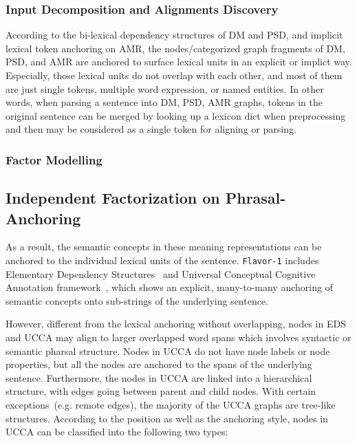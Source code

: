 \subsubsection{Input Decomposition and Alignments Discovery}
\label{sssec:lex-phr:lex-input-decomposition}
According to the bi-lexical dependency structures of DM and PSD, and
implicit lexical token anchoring on AMR, the nodes/categorized graph
fragments of DM, PSD, and AMR are anchored to surface lexical units in
an explicit or implict way. Especially, those lexical units do not
overlap with each other, and most of them are just single tokens,
multiple word expression, or named entities. In other words, when
parsing a sentence into DM, PSD, AMR graphs, tokens in the original
sentence can be merged by looking up a lexicon dict when preprocessing
and then may be considered as a single token for aligning or parsing.

\subsubsection{Factor Modelling}
\label{sssec:lex-phr:factor-modelling}




\subsection{Independent Factorization on Phrasal-Anchoring}
\label{ssec:lex-phr:phr-factorization-analysis}

As a result, the semantic concepts in these meaning
representations can be anchored to the individual lexical units of the
sentence. \texttt{Flavor-1} includes Elementary Dependency
Structures~\cite[EDS,][]{oepen2006discriminant} and Universal
Conceptual Cognitive Annotation
framework~\cite[UCCA,][]{abend2013universal}, which shows an explicit,
many-to-many anchoring of semantic concepts onto sub-strings of the
underlying sentence.

However, different from the lexical anchoring without overlapping,
nodes in EDS and UCCA may align to larger overlapped word spans which
involves syntactic or semantic pharsal structure. Nodes in UCCA do not
have node labels or node properties, but all the nodes are anchored to
the spans of the underlying sentence. Furthermore, the nodes in UCCA
are linked into a hierarchical structure, with edges going between
parent and child nodes. With certain exceptions~(e.g. remote edges),
the majority of the UCCA graphs are tree-like structures. According to
the position as well as the anchoring style, nodes in UCCA can be
classified into the following two types:

